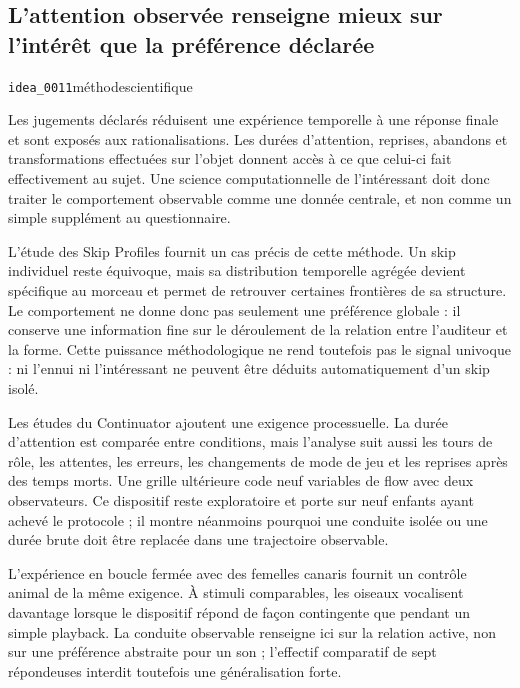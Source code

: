 \documentclass[10pt,a4paper]{article}
\begin{document}
\subsection{L'attention observée renseigne mieux sur l'intérêt que la préférence déclarée}
{\small\color{metadata} \texttt{idea\_0011}\quad\textbullet\quad méthode\quad\textbullet\quad scientifique\par}

Les jugements déclarés réduisent une expérience temporelle à une réponse finale et sont exposés aux rationalisations. Les durées d'attention, reprises, abandons et transformations effectuées sur l'objet donnent accès à ce que celui-ci fait effectivement au sujet. Une science computationnelle de l'intéressant doit donc traiter le comportement observable comme une donnée centrale, et non comme un simple supplément au questionnaire.

L'étude des Skip Profiles fournit un cas précis de cette méthode. Un skip individuel reste équivoque, mais sa distribution temporelle agrégée devient spécifique au morceau et permet de retrouver certaines frontières de sa structure. Le comportement ne donne donc pas seulement une préférence globale : il conserve une information fine sur le déroulement de la relation entre l'auditeur et la forme. Cette puissance méthodologique ne rend toutefois pas le signal univoque : ni l'ennui ni l'intéressant ne peuvent être déduits automatiquement d'un skip isolé.

Les études du Continuator ajoutent une exigence processuelle. La durée d'attention est comparée entre conditions, mais l'analyse suit aussi les tours de rôle, les attentes, les erreurs, les changements de mode de jeu et les reprises après des temps morts. Une grille ultérieure code neuf variables de flow avec deux observateurs. Ce dispositif reste exploratoire et porte sur neuf enfants ayant achevé le protocole ; il montre néanmoins pourquoi une conduite isolée ou une durée brute doit être replacée dans une trajectoire observable.

L'expérience en boucle fermée avec des femelles canaris fournit un contrôle animal de la même exigence. À stimuli comparables, les oiseaux vocalisent davantage lorsque le dispositif répond de façon contingente que pendant un simple playback. La conduite observable renseigne ici sur la relation active, non sur une préférence abstraite pour un son ; l'effectif comparatif de sept répondeuses interdit toutefois une généralisation forte.
\end{document}
